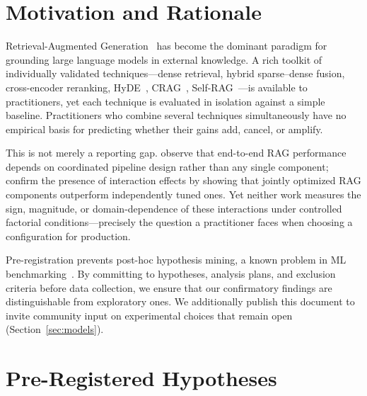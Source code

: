 \documentclass[11pt]{article}
\begin{document}
\section{Motivation and Rationale}

Retrieval-Augmented Generation~\citep{lewis2020rag} has become the
dominant paradigm for grounding large language models in external
knowledge.  A rich toolkit of individually validated
techniques---dense retrieval, hybrid sparse--dense fusion, cross-encoder
reranking, HyDE~\citep{gao2023hyde}, CRAG~\citep{yan2024crag},
Self-RAG~\citep{asai2023selfrag}---is available to practitioners, yet
each technique is evaluated in isolation against a simple baseline.
Practitioners who combine several techniques simultaneously have no
empirical basis for predicting whether their gains add, cancel, or
amplify.

This is not merely a reporting gap.
\citet{wang2024searching} observe that end-to-end RAG performance
depends on coordinated pipeline design rather than any single component;
\citet{chen2025mmoarag} confirm the presence of interaction effects by
showing that jointly optimized RAG components outperform independently
tuned ones.  Yet neither work measures the sign, magnitude, or
domain-dependence of these interactions under controlled factorial
conditions---precisely the question a practitioner faces when choosing a
configuration for production.

Pre-registration prevents post-hoc hypothesis mining, a known problem in
ML benchmarking~\citep{dodge2019importance,bouthillier2021accounting}.
By committing to hypotheses, analysis plans, and exclusion criteria
before data collection, we ensure that our confirmatory findings are
distinguishable from exploratory ones.  We additionally publish this
document to invite community input on experimental choices that remain
open (Section~\ref{sec:models}).

\section{Pre-Registered Hypotheses}
\label{sec:hypotheses}
\end{document}
